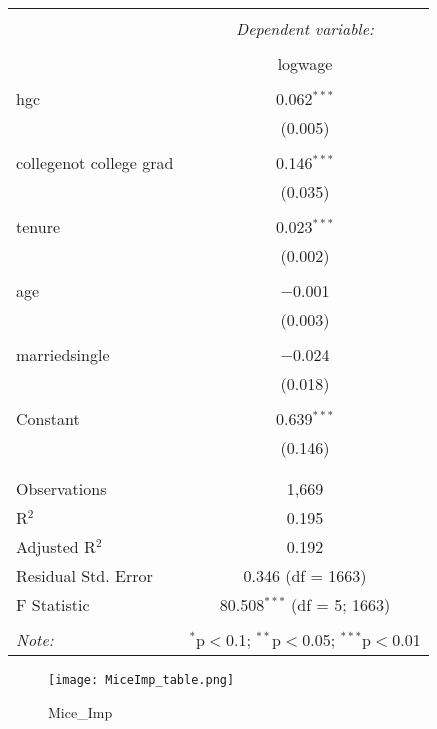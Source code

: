 \documentclass{article}
\begin{document}
\begin{table}[!htbp] \centering 
  \caption{} 
  \label{} 
\begin{tabular}{@{\extracolsep{5pt}}lc} 
\\[-1.8ex]\hline 
\hline \\[-1.8ex] 
 & \multicolumn{1}{c}{\textit{Dependent variable:}} \\ 
\cline{2-2} 
\\[-1.8ex] & logwage \\ 
\hline \\[-1.8ex] 
 hgc & 0.062$^{***}$ \\ 
  & (0.005) \\ 
  & \\ 
 collegenot college grad & 0.146$^{***}$ \\ 
  & (0.035) \\ 
  & \\ 
 tenure & 0.023$^{***}$ \\ 
  & (0.002) \\ 
  & \\ 
 age & $-$0.001 \\ 
  & (0.003) \\ 
  & \\ 
 marriedsingle & $-$0.024 \\ 
  & (0.018) \\ 
  & \\ 
 Constant & 0.639$^{***}$ \\ 
  & (0.146) \\ 
  & \\ 
\hline \\[-1.8ex] 
Observations & 1,669 \\ 
R$^{2}$ & 0.195 \\ 
Adjusted R$^{2}$ & 0.192 \\ 
Residual Std. Error & 0.346 (df = 1663) \\ 
F Statistic & 80.508$^{***}$ (df = 5; 1663) \\ 
\hline 
\hline \\[-1.8ex] 
\textit{Note:}  & \multicolumn{1}{r}{$^{*}$p$<$0.1; $^{**}$p$<$0.05; $^{***}$p$<$0.01} \\ 
\end{tabular} 
\end{table} 

\begin{figure}[h!]
\centering
\texttt{[image: MiceImp\_table.png]}
\caption{Mice_Imp}
\end{figure}
\end{document}
